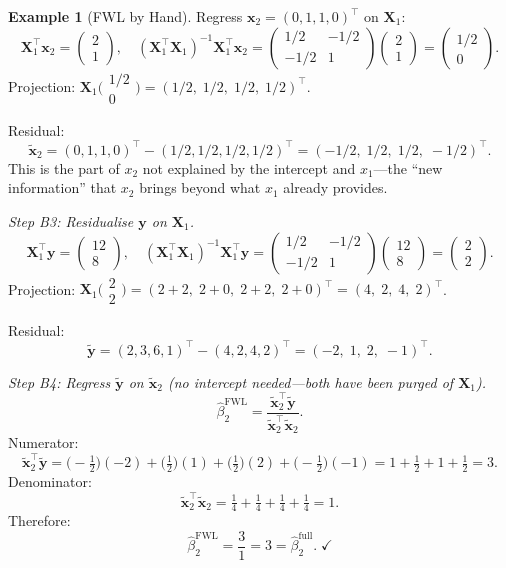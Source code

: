 \documentclass[11pt,a4paper]{article}
\theoremstyle{plain}
\theoremstyle{definition}
\newtheorem{example}[theorem]{Example}
\newcommand{\bX}{\bm{X}}
\newcommand{\by}{\bm{y}}
\begin{document}
\begin{example}[FWL by Hand]
Regress $\bm{x}_2=(0,1,1,0)^\top$ on $\bX_1$:
\[
\bX_1^\top\bm{x}_2 = \begin{pmatrix}2\\1\end{pmatrix},\quad
(\bX_1^\top\bX_1)^{-1}\bX_1^\top\bm{x}_2
= \begin{pmatrix}1/2&-1/2\\-1/2&1\end{pmatrix}\begin{pmatrix}2\\1\end{pmatrix}
= \begin{pmatrix}1/2\\0\end{pmatrix}.
\]
Projection: $\bX_1\bigl(\begin{smallmatrix}1/2\\0\end{smallmatrix}\bigr)
= (1/2,\;1/2,\;1/2,\;1/2)^\top$.

Residual:
\[
\tilde{\bm{x}}_2 = (0,1,1,0)^\top - (1/2,1/2,1/2,1/2)^\top = (-1/2,\;1/2,\;1/2,\;-1/2)^\top.
\]
This is the part of $x_2$ not explained by the intercept and $x_1$---the ``new information'' that $x_2$ brings beyond what $x_1$ already provides.

\emph{Step B3: Residualise $\by$ on $\bX_1$.}
\[
\bX_1^\top\by = \begin{pmatrix}12\\8\end{pmatrix},\quad
(\bX_1^\top\bX_1)^{-1}\bX_1^\top\by
= \begin{pmatrix}1/2&-1/2\\-1/2&1\end{pmatrix}\begin{pmatrix}12\\8\end{pmatrix}
= \begin{pmatrix}2\\2\end{pmatrix}.
\]
Projection: $\bX_1\bigl(\begin{smallmatrix}2\\2\end{smallmatrix}\bigr)
= (2+2,\;2+0,\;2+2,\;2+0)^\top = (4,\;2,\;4,\;2)^\top$.

Residual:
\[
\tilde{\by} = (2,3,6,1)^\top - (4,2,4,2)^\top
= (-2,\;1,\;2,\;-1)^\top.
\]

\emph{Step B4: Regress $\tilde{\by}$ on $\tilde{\bm{x}}_2$ (no intercept needed---both have been purged of $\bX_1$).}
\[
\hat\beta_2^{\text{FWL}} = \frac{\tilde{\bm{x}}_2^\top\tilde{\by}}{\tilde{\bm{x}}_2^\top\tilde{\bm{x}}_2}.
\]
Numerator:
\[
\tilde{\bm{x}}_2^\top\tilde{\by}
= \bigl(-\tfrac{1}{2}\bigr)(-2) + \bigl(\tfrac{1}{2}\bigr)(1)
  + \bigl(\tfrac{1}{2}\bigr)(2) + \bigl(-\tfrac{1}{2}\bigr)(-1)
= 1 + \tfrac{1}{2} + 1 + \tfrac{1}{2} = 3.
\]
Denominator:
\[
\tilde{\bm{x}}_2^\top\tilde{\bm{x}}_2
= \tfrac{1}{4}+\tfrac{1}{4}+\tfrac{1}{4}+\tfrac{1}{4} = 1.
\]
Therefore:
\[
\boxed{\hat\beta_2^{\text{FWL}} = \frac{3}{1} = 3 = \hat\beta_2^{\text{full}}.}\;\checkmark
\]


\end{example}
\end{document}
